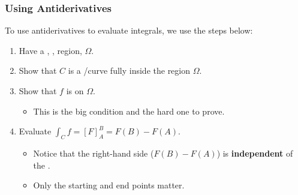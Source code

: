 \subsubsection{Using Antiderivatives}\label{subsubsec:Using_Antiderivatives}
To use antiderivatives to evaluate integrals, we use the steps below:
\begin{enumerate}[noitemsep]
\item Have a , ,  region, $\Omega$.
\item Show that $C$ is a /curve fully inside the region $\Omega$.
\item Show that $f$ is  on $\Omega$.
  \begin{itemize}[noitemsep]
  \item This is the big condition and the hard one to prove.
  \end{itemize}
\item Evaluate $\int_{C} f = {[F]}_{A}^{B} = F(B) - F(A)$.
  \begin{itemize}[noitemsep]
  \item Notice that the right-hand side ($F(B) - F(A)$) is \textbf{independent} of the .
  \item Only the starting and end points matter.
  \end{itemize}
\end{enumerate}

